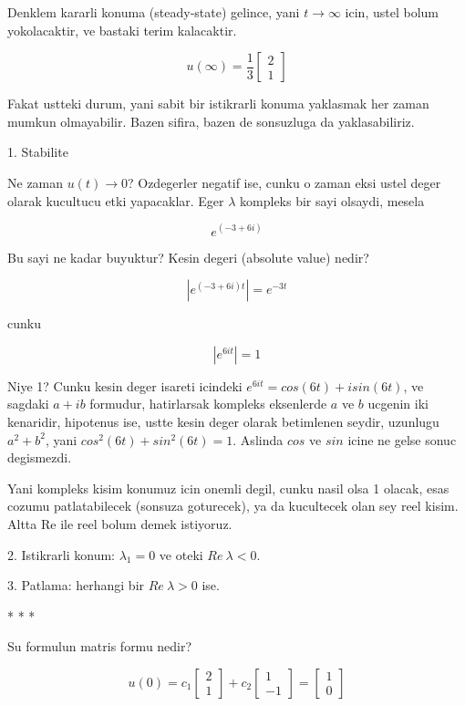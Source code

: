 \documentclass[12pt,fleqn]{article}
\begin{document}
Denklem kararli konuma (steady-state) gelince, yani $t \rightarrow \infty$ icin,
ustel bolum yokolacaktir, ve bastaki terim kalacaktir. 

\[ u(\infty) =
\frac{1}{3}
\left[\begin{array}{c}
2 \\ 1
\end{array}\right]
 \]

Fakat ustteki durum, yani sabit bir istikrarli konuma yaklasmak her zaman
mumkun olmayabilir. Bazen sifira, bazen de sonsuzluga da yaklasabiliriz. 

1. Stabilite 

Ne zaman $u(t) \rightarrow 0$? Ozdegerler negatif ise, cunku o zaman eksi
ustel deger olarak kucultucu etki yapacaklar. Eger $\lambda$ kompleks bir
sayi olsaydi, mesela 

\[ e^{(-3 + 6i)} \]

Bu sayi ne kadar buyuktur? Kesin degeri (absolute value) nedir? 

\[ | e^{(-3 + 6i)t}| = e^{-3t} \]

cunku 

\[ |e^{6it}| = 1 \]

Niye 1? Cunku kesin deger isareti icindeki $e^{6it} = cos(6t)+isin(6t)$, ve
sagdaki $a+ib$ formudur, hatirlarsak kompleks eksenlerde $a$ ve $b$ ucgenin
iki kenaridir, hipotenus ise, ustte kesin deger olarak betimlenen seydir,
uzunlugu $a^2 + b^2$, yani $cos^2(6t) + sin^2(6t) = 1$. Aslinda $cos$ ve
$sin$ icine ne gelse sonuc degismezdi. 

Yani kompleks kisim konumuz icin onemli degil, cunku nasil olsa 1 olacak,
esas cozumu patlatabilecek (sonsuza goturecek), ya da kucultecek olan sey
reel kisim. Altta Re ile reel bolum demek istiyoruz.

2. Istikrarli konum: $\lambda_1 = 0$ ve oteki $Re \ \lambda < 0$. 

3. Patlama: herhangi bir $Re \ \lambda > 0$ ise. 

* * * 

Su formulun matris formu nedir?

\[ u(0) =
c_1 
\left[\begin{array}{c}
2 \\ 1
\end{array}\right]
+
c_2 
\left[\begin{array}{c}
1 \\ -1
\end{array}\right] 
=
\left[\begin{array}{c}
1 \\ 0
\end{array}\right] 
\]
\end{document}
